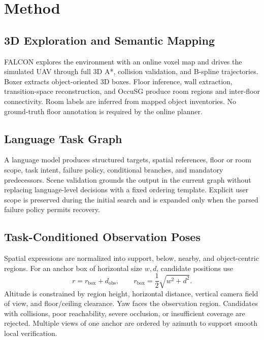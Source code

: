 \documentclass[11pt]{article}
\begin{document}
\section{Method}
\subsection{3D Exploration and Semantic Mapping}
FALCON explores the environment with an online voxel map and drives the simulated UAV through full 3D A*, collision validation, and B-spline trajectories. Boxer extracts object-oriented 3D boxes. Floor inference, wall extraction, transition-space reconstruction, and OccuSG produce room regions and inter-floor connectivity. Room labels are inferred from mapped object inventories. No ground-truth floor annotation is required by the online planner.

\subsection{Language Task Graph}
A language model produces structured targets, spatial references, floor or room scope, task intent, failure policy, conditional branches, and mandatory predecessors. Scene validation grounds the output in the current graph without replacing language-level decisions with a fixed ordering template. Explicit user scope is preserved during the initial search and is expanded only when the parsed failure policy permits recovery.

\subsection{Task-Conditioned Observation Poses}
Spatial expressions are normalized into support, below, nearby, and object-centric regions. For an anchor box of horizontal size $w,d$, candidate positions use
\begin{equation}
r=r_{\mathrm{box}}+d_{\mathrm{obs}},\qquad
r_{\mathrm{box}}=\frac{1}{2}\sqrt{w^2+d^2}.
\end{equation}
Altitude is constrained by region height, horizontal distance, vertical camera field of view, and floor/ceiling clearance. Yaw faces the observation region. Candidates with collisions, poor reachability, severe occlusion, or insufficient coverage are rejected. Multiple views of one anchor are ordered by azimuth to support smooth local verification.
\end{document}
